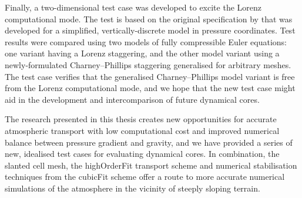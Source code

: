 Finally, a two-dimensional test case was developed to excite the Lorenz computational mode.
The test is based on the original specification by \citet{arakawa-konor1996} that was developed for a simplified, vertically-discrete model in pressure coordinates.
Test results were compared using two models of fully compressible Euler equations: one variant having a Lorenz staggering, and the other model variant using a newly-formulated Charney--Phillips staggering generalised for arbitrary meshes.
The test case verifies that the generalised Charney--Phillips model variant is free from the Lorenz computational mode, and we hope that the new test case might aid in the development and intercomparison of future dynamical cores.

The research presented in this thesis creates new opportunities for accurate atmospheric transport with low computational cost and improved numerical balance between pressure gradient and gravity, and we have provided a series of new, idealised test cases for evaluating dynamical cores.
In combination, the slanted cell mesh, the highOrderFit transport scheme and numerical stabilisation techniques from the cubicFit scheme offer a route to more accurate numerical simulations of the atmosphere in the vicinity of steeply sloping terrain.
